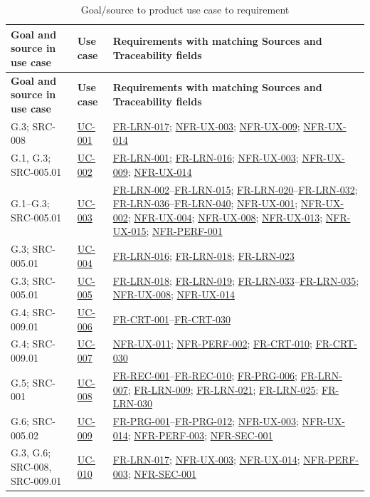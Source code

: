 \documentclass[12pt]{article}
\renewcommand{\_}{\textunderscore\allowbreak}%
\newcommand{\ucref}[1]{\hyperref[uc:#1]{\mbox{UC-#1}}}
\newcommand{\reqref}[1]{\hyperref[req:#1]{#1}}
\providecommand{\ucref}[1]{\hyperref[uc:#1]{UC-#1}}
\begin{document}
{\small
\begin{longtable}{@{}>{\raggedright\arraybackslash}p{}
>{\raggedright\arraybackslash}p{}
>{\raggedright\arraybackslash}p{}@{}}
\caption{Goal/source to product use case to requirement}
\label{tab:goal-uc-req}\\
\toprule
\textbf{Goal and source in use case} & \textbf{Use case} & \textbf{Requirements
with matching Sources and Traceability fields} \\
\midrule
\endfirsthead
\toprule
\textbf{Goal and source in use case} & \textbf{Use case} & \textbf{Requirements
with matching Sources and Traceability fields} \\
\midrule
\endhead
\bottomrule
\endlastfoot
G.3; SRC-008 & \ucref{001} & \reqref{FR-LRN-017}; \reqref{NFR-UX-003};
\reqref{NFR-UX-009}; \reqref{NFR-UX-014} \\
\addlinespace
G.1, G.3; SRC-005.01 & \ucref{002} & \reqref{FR-LRN-001}; \reqref{FR-LRN-016};
\reqref{NFR-UX-003}; \reqref{NFR-UX-009}; \reqref{NFR-UX-014} \\
\addlinespace
G.1--G.3; SRC-005.01 & \ucref{003} & \reqref{FR-LRN-002}--\reqref{FR-LRN-015};
\reqref{FR-LRN-020}--\reqref{FR-LRN-032}; \reqref{FR-LRN-036}--\reqref{FR-LRN-040}; \reqref{NFR-UX-001};
\reqref{NFR-UX-002}; \reqref{NFR-UX-004}; \reqref{NFR-UX-008};
\reqref{NFR-UX-013}; \reqref{NFR-UX-015}; \reqref{NFR-PERF-001} \\
\addlinespace
G.3; SRC-005.01 & \ucref{004} & \reqref{FR-LRN-016}; \reqref{FR-LRN-018};
\reqref{FR-LRN-023} \\
\addlinespace
G.3; SRC-005.01 & \ucref{005} & \reqref{FR-LRN-018}; \reqref{FR-LRN-019}; \reqref{FR-LRN-033}--\reqref{FR-LRN-035};
\reqref{NFR-UX-008}; \reqref{NFR-UX-014} \\
\addlinespace
G.4; SRC-009.01 & \ucref{006} & \reqref{FR-CRT-001}--\reqref{FR-CRT-030} \\
\addlinespace
G.4; SRC-009.01 & \ucref{007} & \reqref{NFR-UX-011}; \reqref{NFR-PERF-002};
\reqref{FR-CRT-010}; \reqref{FR-CRT-030} \\
\addlinespace
G.5; SRC-001 & \ucref{008} & \reqref{FR-REC-001}--\reqref{FR-REC-010};
\reqref{FR-PRG-006}; \reqref{FR-LRN-007}; \reqref{FR-LRN-009};
\reqref{FR-LRN-021}; \reqref{FR-LRN-025}; \reqref{FR-LRN-030} \\
\addlinespace
G.6; SRC-005.02 & \ucref{009} & \reqref{FR-PRG-001}--\reqref{FR-PRG-012};
\reqref{NFR-UX-003}; \reqref{NFR-UX-014}; \reqref{NFR-PERF-003};
\reqref{NFR-SEC-001} \\
\addlinespace
G.3, G.6; SRC-008, SRC-009.01 & \ucref{010} & \reqref{FR-LRN-017};
\reqref{NFR-UX-003}; \reqref{NFR-UX-014}; \reqref{NFR-PERF-003};
\reqref{NFR-SEC-001} \\
\end{longtable}}
\end{document}
